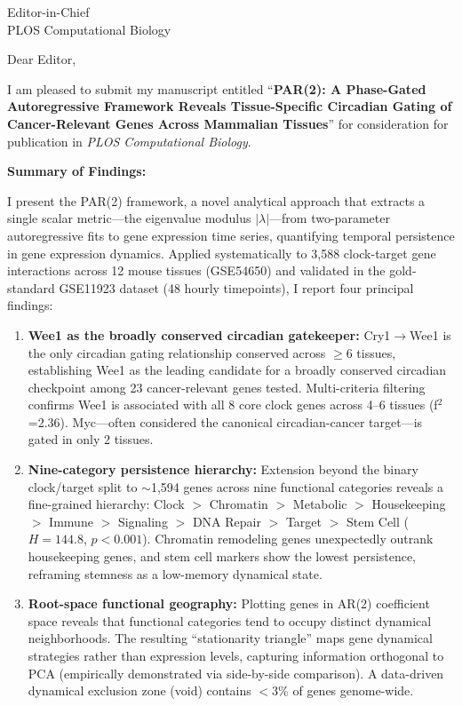 \documentclass[11pt]{letter}
\begin{document}
\begin{letter}{Editor-in-Chief \\ PLOS Computational Biology}

\opening{Dear Editor,}

I am pleased to submit my manuscript entitled ``\textbf{PAR(2): A Phase-Gated Autoregressive Framework Reveals Tissue-Specific Circadian Gating of Cancer-Relevant Genes Across Mammalian Tissues}'' for consideration for publication in \textit{PLOS Computational Biology}.

\textbf{Summary of Findings:}

I present the PAR(2) framework, a novel analytical approach that extracts a single scalar metric---the eigenvalue modulus $|\lambda|$---from two-parameter autoregressive fits to gene expression time series, quantifying temporal persistence in gene expression dynamics. Applied systematically to 3,588 clock-target gene interactions across 12 mouse tissues (GSE54650) and validated in the gold-standard GSE11923 dataset (48 hourly timepoints), I report four principal findings:

\begin{enumerate}
    \item \textbf{Wee1 as the broadly conserved circadian gatekeeper:} Cry1$\rightarrow$Wee1 is the only circadian gating relationship conserved across $\geq$6 tissues, establishing Wee1 as the leading candidate for a broadly conserved circadian checkpoint among 23 cancer-relevant genes tested. Multi-criteria filtering confirms Wee1 is associated with all 8 core clock genes across 4--6 tissues (f$^2$=2.36). Myc---often considered the canonical circadian-cancer target---is gated in only 2 tissues.

    \item \textbf{Nine-category persistence hierarchy:} Extension beyond the binary clock/target split to $\sim$1,594 genes across nine functional categories reveals a fine-grained hierarchy: Clock $>$ Chromatin $>$ Metabolic $>$ Housekeeping $>$ Immune $>$ Signaling $>$ DNA Repair $>$ Target $>$ Stem Cell ($H=144.8$, $p<0.001$). Chromatin remodeling genes unexpectedly outrank housekeeping genes, and stem cell markers show the lowest persistence, reframing stemness as a low-memory dynamical state.

    \item \textbf{Root-space functional geography:} Plotting genes in AR(2) coefficient space reveals that functional categories tend to occupy distinct dynamical neighborhoods. The resulting ``stationarity triangle'' maps gene dynamical strategies rather than expression levels, capturing information orthogonal to PCA (empirically demonstrated via side-by-side comparison). A data-driven dynamical exclusion zone (void) contains $<$3\% of genes genome-wide.


\end{enumerate}
\end{letter}
\end{document}
